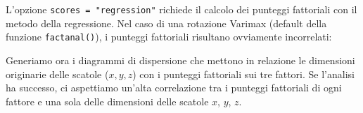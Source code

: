 \documentclass[
  11pt,
]{krantz}
\makeatletter
\newenvironment{Shaded}{\begin{snugshade}}{\end{snugshade}}
\newcommand{\CommentTok}[1]{\textcolor[rgb]{0.37,0.37,0.37}{\textit{#1}}}
\newcommand{\DecValTok}[1]{\textcolor[rgb]{0.06,0.06,0.06}{#1}}
\newcommand{\FunctionTok}[1]{\textcolor[rgb]{0,0,0}{#1}}
\newcommand{\NormalTok}[1]{#1}
\newcommand{\SpecialCharTok}[1]{\textcolor[rgb]{0,0,0}{#1}}
\newenvironment{kframe}{%
\medskip{}
\setlength{\fboxsep}{.8em}
 \def\at@end@of@kframe{}%
 \ifinner\ifhmode%
  \def\at@end@of@kframe{\end{minipage}}%
  \begin{minipage}{\columnwidth}%
 \fi\fi%
 \def\FrameCommand##1{\hskip\@totalleftmargin \hskip-\fboxsep
 \colorbox{shadecolor}{##1}\hskip-\fboxsep
     \hskip-\linewidth \hskip-\@totalleftmargin \hskip\columnwidth}%
 \MakeFramed {\advance\hsize-\width
   \@totalleftmargin\z@ \linewidth\hsize
   \@setminipage}}%
 {\par\unskip\endMakeFramed%
 \at@end@of@kframe}
\renewenvironment{Shaded}{\begin{kframe}}{\end{kframe}}
\makeatother
\begin{document}
L'opzione \texttt{scores\ =\ "regression"} richiede il calcolo dei punteggi fattoriali con il metodo della regressione. Nel caso di una rotazione Varimax (default della funzione \texttt{factanal()}), i punteggi fattoriali risultano ovviamente incorrelati:

\begin{Shaded}
\end{Shaded}

Generiamo ora i diagrammi di dispersione che mettono in relazione le dimensioni originarie delle scatole (\(x, y, z\)) con i punteggi fattoriali sui tre fattori. Se l'analisi ha successo, ci aspettiamo un'alta correlazione tra i punteggi fattoriali di ogni fattore e una sola delle dimensioni delle scatole \(x\), \(y\), \(z\).
\end{document}

